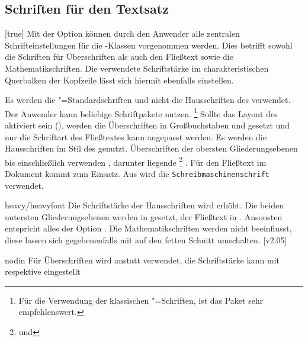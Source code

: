 \begin{Declaration*}{}
\begin{Declaration*}{}
\begin{Declaration*}{}
\subsection{Schriften für den Textsatz}
%
%
%
\begin{Declaration}[%
  v2.02!\Option{cdfont=head};
  v2.02!\Option{cdfont=heavyhead};
  v2.03!\Option{cdfont=din};
  v2.03!\Option{cdfont=nodin};
]{}[true]%
\printdeclarationlist%
%
Mit der Option  können durch den Anwender alle zentralen 
Schrifteinstellungen für die \TUDScript-Klassen vorgenommen werden. Dies 
betrifft sowohl die Schriften für Überschriften als auch den Fließtext sowie 
die Mathematikschriften. Die verwendete Schriftstärke im charakteristischen 
Querbalken der Kopfzeile lässt sich hiermit ebenfalls einstellen.
%
\begin{values}{}
\itemfalse
  Es werden die "=Standardschriften und nicht die Hausschriften 
  des \CDs verwendet. Der Anwender kann beliebige Schriftpakete nutzen.%
  \footnote{%
    Für die Verwendung der klassischen "=Schriften, ist das Paket 
     sehr empfehlenswert.%
  }
  Sollte das Layout des \CDs aktiviert sein (), werden die 
  Überschriften in Großbuchstaben und \DIN gesetzt und nur die Schriftart des 
  Fließtextes kann angepasst werden.
  Es werden die Hausschriften im Stil des \TUDCDs genutzt. Überschriften der 
  obersten Gliederungsebenen bis einschließlich  
  verwenden \DIN, darunter liegende%
  \footnote{ und } 
  . Für den Fließtext im Dokument kommt 
   zum Einsatz. Aus  wird die
  \texttt{Schreibmaschinenschrift} verwendet.
\item[heavy/heavyfont]
  Die Schriftstärke der Hausschriften wird erhöht. Die beiden untersten 
  Gliederungsebenen werden in  gesetzt, der Fließtext 
  in . Ansonsten entspricht alles der Option 
  . Die Mathematikschriften werden nicht beeinflusst, 
  diese lassen sich gegebenenfalls mit  auf den fetten Schnitt 
  umschalten.
[v2.05]
\item[nodin]
  Für Überschriften wird \Univers anstatt \DIN verwendet, die Schriftstärke 
  kann mit  respektive  eingestellt 

\end{values}
\end{Declaration}
\end{Declaration*}
\end{Declaration*}
\end{Declaration*}
